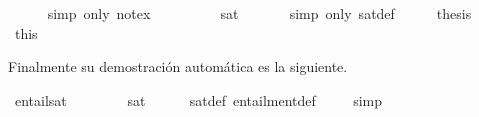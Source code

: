 \begin{isabellebody}
\ \ \ \ \isamarkupfalse%
\ {\isacharparenleft}simp\ only{\isacharcolon}\ not{\isacharunderscore}ex{\isacharparenright}\ \isanewline
\ \ \isamarkupfalse%
\ \isamarkupfalse%
\ {\isachardoublequoteopen}{\isasymdots}\ {\isacharequal}\ {\isacharparenleft}{\isasymnot}\ sat\ {\isasymGamma}{\isacharparenright}{\isachardoublequoteclose}\isanewline
\ \ \ \ \isamarkupfalse%
\ {\isacharparenleft}simp\ only{\isacharcolon}\ sat{\isacharunderscore}def{\isacharparenright}\isanewline
\ \ \isamarkupfalse%
\ \isamarkupfalse%
\ {\isacharquery}thesis\isanewline
\ \ \ \ \isamarkupfalse%
\ this\isanewline
{}\isamarkupfalse%
%
\endisatagproof
{\isafoldproof}%
%
\isadelimproof
%
\endisadelimproof
%
\begin{isamarkuptext}%
Finalmente su demostración automática es la siguiente.%
\end{isamarkuptext}\isamarkuptrue%
\isamarkupfalse%
\ entail{\isacharunderscore}sat{\isacharcolon}\ \isanewline
\ \ {\isachardoublequoteopen}{\isasymGamma}\ {\isasymTTurnstile}\ {\isasymbottom}\ {\isasymlongleftrightarrow}\ {\isasymnot}\ sat\ {\isasymGamma}{\isachardoublequoteclose}\ \isanewline
%
\isadelimproof
\ \ %
\endisadelimproof
%
\isatagproof
{}\isamarkupfalse%
\ sat{\isacharunderscore}def\ entailment{\isacharunderscore}def\ \isanewline
\ \ \isamarkupfalse%
\ simp\isanewline
%
\endisatagproof
{\isafoldproof}%
%
\isadelimproof
%
\endisadelimproof
%
\isadelimtheory
%
\endisadelimtheory
%
\isatagtheory
%
\endisatagtheory
{\isafoldtheory}%
%
\isadelimtheory
%
\endisadelimtheory
%
\end{isabellebody}%
\endinput

